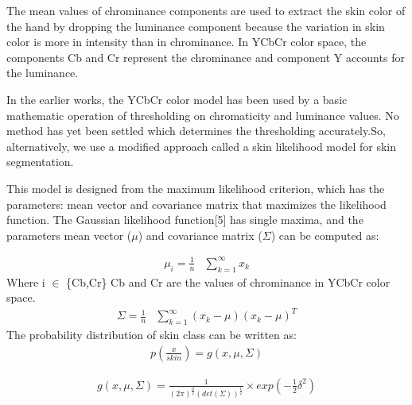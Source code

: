 \documentclass[conference]{IEEEtran}
\begin{document}
The mean values of chrominance components are used to extract the skin color of the hand by dropping the luminance component because the variation in skin color is more in intensity than in chrominance. In YCbCr color space, the components Cb and Cr represent the chrominance and component Y accounts for the luminance.

In the earlier works, the YCbCr color model has been used by a basic mathematic operation of thresholding on chromaticity and luminance values. No method has yet been settled which determines the thresholding accurately.So, alternatively, we use a modified approach called a skin likelihood model for skin segmentation.

This model is designed from the maximum likelihood criterion, which has the parameters: mean vector and covariance matrix that maximizes the likelihood function. The Gaussian likelihood function[5] has single maxima, and the parameters mean vector ($\mu$) and covariance matrix ($\Sigma$) can be computed as:

\begin{equation}
\begin{aligned}
\mu_i = \frac{1}{n} & \sum_{k=1}^\infty x_k
\end{aligned}
\end{equation}
Where i $\in$ \{Cb,Cr\}  Cb and Cr are the values of chrominance in YCbCr color space.
\begin{equation}
\begin{aligned}
\Sigma = \frac{1}{n} & \sum_{k=1}^\infty \left(x_k - \mu \right)\left(x_k - \mu \right)^T
\end{aligned}
\end{equation}
The probability distribution of skin class can be written as:
\begin{equation}
\begin{aligned}
p(\frac{x}{skin}) =  g(x,\mu,\Sigma)
\end{aligned}
\end{equation}

\begin{equation}
\begin{aligned}
g(x,\mu,\Sigma) =  \frac{1}{(2\pi)^{\frac{d}{2}}\left(det\left(\Sigma \right)\right)^\frac{1}{2}} \times exp(-\frac{1}{2}\delta^2)
\end{aligned}
\end{equation}
\end{document}
